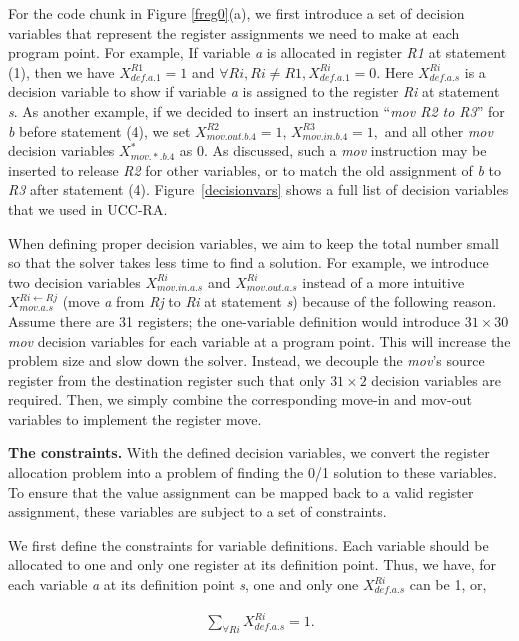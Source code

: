 For the code chunk in Figure \ref{freg0}(a), we first introduce a set
of decision variables that represent the register assignments we need
to make at each program point. For example, If variable {\it a} is allocated in
register {\it R1} at statement (1), then we have $X_{def.a.1}^{R1}=1$
and $\forall Ri, Ri\neq R1, X_{def.a.1}^{Ri}=0$. Here
$X_{def.a.s}^{Ri}$ is a decision variable to show if variable {\it a}
is assigned to the register {\it Ri} at statement {\it s}. 
As another example,
if we decided to insert an instruction ``{\it mov R2 to R3}'' for {\it
b} before statement (4), we set $ X_{mov.out.b.4}^{R2}=1$,
$X_{mov.in.b.4}^{R3}=1,$ and all other {\it mov} decision variables
$X_{mov.*.b.4}^{*}$ as 0. As discussed, such a {\it mov}
instruction may be inserted to release {\it R2} for other variables,
or to match the old assignment of {\it b} to {\it R3} after statement
(4).  Figure~\ref{decisionvars} shows a full list of decision variables that we used in
UCC-RA.


When defining proper decision variables, we aim to keep the total
number small so that the solver takes less time to find a
solution. For example, we introduce two decision variables
$X_{mov.in.a.s}^{Ri}$ and $X_{mov.out.a.s}^{Ri}$ instead of a more
intuitive $X_{mov.a.s}^{Ri\leftarrow Rj}$ (move {\it a} from {\it Rj}
to {\it Ri} at statement {\it s}) because of the following reason.
Assume there are 31 registers; the one-variable definition would
introduce $31\times30$ {\em mov} decision variables for each variable
at a program point. This will increase the problem size and slow down
the solver. Instead, we decouple the {\it mov}'s source register from
the destination register such that only $31\times 2$ decision
variables are required. Then, we simply combine the
corresponding move-in and mov-out variables to implement the register
move.

\textbf{The constraints.} 
With the defined decision variables, we convert the register allocation
problem into a problem of finding the 0/1 solution to these
variables. To ensure that the value assignment can be mapped back to a
valid register assignment, these variables are subject to a set of
constraints.

We first define the constraints for variable definitions.  Each
variable should be allocated to one and only one register at its
definition point. Thus, we have, for each variable {\it a} at its
definition point {\it s}, one and only one $X_{def.a.s}^{Ri}$ can be
1, or,

\begin{small}
\begin{eqnarray}
\sum_{\forall Ri} X_{def.a.s}^{Ri} = 1.
\end{eqnarray}
\end{small}

